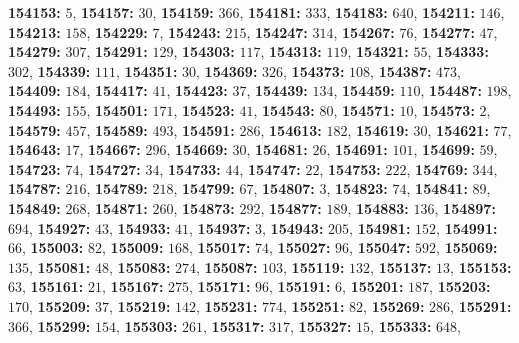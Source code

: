 \textsf{\bfseries 154153:} $5$, \textsf{\bfseries 154157:} $30$, \textsf{\bfseries 154159:} $366$, \textsf{\bfseries 154181:} $333$, \textsf{\bfseries 154183:} $640$, \textsf{\bfseries 154211:} $146$, \textsf{\bfseries 154213:} $158$, \textsf{\bfseries 154229:} $7$, \textsf{\bfseries 154243:} $215$, \textsf{\bfseries 154247:} $314$, \textsf{\bfseries 154267:} $76$, \textsf{\bfseries 154277:} $47$, \textsf{\bfseries 154279:} $307$, \textsf{\bfseries 154291:} $129$, \textsf{\bfseries 154303:} $117$, \textsf{\bfseries 154313:} $119$, \textsf{\bfseries 154321:} $55$, \textsf{\bfseries 154333:} $302$, \textsf{\bfseries 154339:} $111$, \textsf{\bfseries 154351:} $30$, \textsf{\bfseries 154369:} $326$, \textsf{\bfseries 154373:} $108$, \textsf{\bfseries 154387:} $473$, \textsf{\bfseries 154409:} $184$, \textsf{\bfseries 154417:} $41$, \textsf{\bfseries 154423:} $37$, \textsf{\bfseries 154439:} $134$, \textsf{\bfseries 154459:} $110$, \textsf{\bfseries 154487:} $198$, \textsf{\bfseries 154493:} $155$, \textsf{\bfseries 154501:} $171$, \textsf{\bfseries 154523:} $41$, \textsf{\bfseries 154543:} $80$, \textsf{\bfseries 154571:} $10$, \textsf{\bfseries 154573:} $2$, \textsf{\bfseries 154579:} $457$, \textsf{\bfseries 154589:} $493$, \textsf{\bfseries 154591:} $286$, \textsf{\bfseries 154613:} $182$, \textsf{\bfseries 154619:} $30$, \textsf{\bfseries 154621:} $77$, \textsf{\bfseries 154643:} $17$, \textsf{\bfseries 154667:} $296$, \textsf{\bfseries 154669:} $30$, \textsf{\bfseries 154681:} $26$, \textsf{\bfseries 154691:} $101$, \textsf{\bfseries 154699:} $59$, \textsf{\bfseries 154723:} $74$, \textsf{\bfseries 154727:} $34$, \textsf{\bfseries 154733:} $44$, \textsf{\bfseries 154747:} $22$, \textsf{\bfseries 154753:} $222$, \textsf{\bfseries 154769:} $344$, \textsf{\bfseries 154787:} $216$, \textsf{\bfseries 154789:} $218$, \textsf{\bfseries 154799:} $67$, \textsf{\bfseries 154807:} $3$, \textsf{\bfseries 154823:} $74$, \textsf{\bfseries 154841:} $89$, \textsf{\bfseries 154849:} $268$, \textsf{\bfseries 154871:} $260$, \textsf{\bfseries 154873:} $292$, \textsf{\bfseries 154877:} $189$, \textsf{\bfseries 154883:} $136$, \textsf{\bfseries 154897:} $694$, \textsf{\bfseries 154927:} $43$, \textsf{\bfseries 154933:} $41$, \textsf{\bfseries 154937:} $3$, \textsf{\bfseries 154943:} $205$, \textsf{\bfseries 154981:} $152$, \textsf{\bfseries 154991:} $66$, \textsf{\bfseries 155003:} $82$, \textsf{\bfseries 155009:} $168$, \textsf{\bfseries 155017:} $74$, \textsf{\bfseries 155027:} $96$, \textsf{\bfseries 155047:} $592$, \textsf{\bfseries 155069:} $135$, \textsf{\bfseries 155081:} $48$, \textsf{\bfseries 155083:} $274$, \textsf{\bfseries 155087:} $103$, \textsf{\bfseries 155119:} $132$, \textsf{\bfseries 155137:} $13$, \textsf{\bfseries 155153:} $63$, \textsf{\bfseries 155161:} $21$, \textsf{\bfseries 155167:} $275$, \textsf{\bfseries 155171:} $96$, \textsf{\bfseries 155191:} $6$, \textsf{\bfseries 155201:} $187$, \textsf{\bfseries 155203:} $170$, \textsf{\bfseries 155209:} $37$, \textsf{\bfseries 155219:} $142$, \textsf{\bfseries 155231:} $774$, \textsf{\bfseries 155251:} $82$, \textsf{\bfseries 155269:} $286$, \textsf{\bfseries 155291:} $366$, \textsf{\bfseries 155299:} $154$, \textsf{\bfseries 155303:} $261$, \textsf{\bfseries 155317:} $317$, \textsf{\bfseries 155327:} $15$, \textsf{\bfseries 155333:} $648$, 
